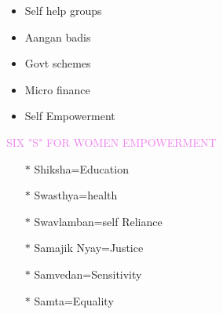 \documentclass[landscape]{slides}
\begin{document}
\begin{slide}
\begin{itemize}
\item \tiny Self help groups
\item \tiny Aangan badis
\item \tiny Govt schemes
\item \tiny Micro finance
\item \tiny Self Empowerment
\end{itemize}
\end{slide}
\begin{slide}
\textcolor{violet}{\large SIX "S" FOR WOMEN EMPOWERMENT}
\begin{itemize}
\item[$\ast$]  Shiksha=Education
\item[$\ast$]  Swasthya=health
\item[$\ast$]  Swavlamban=self Reliance
\item[$\ast$]  Samajik Nyay=Justice
\item[$\ast$]  Samvedan=Sensitivity
\item[$\ast$]  Samta=Equality
\end{itemize}
\end{slide}
\end{document}
